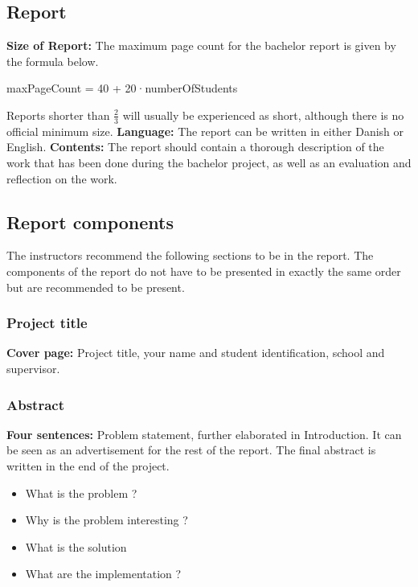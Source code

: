 \subsection{Report}
\textbf{Size of Report:} The maximum page count for the bachelor report is given by the formula below.
\begin{center}maxPageCount = 40 + 20·numberOfStudents\end{center}
Reports shorter than \(\frac{2}{3}\) will usually be experienced as short, although there is no official minimum size.
\newline
\newline
\textbf{Language:} The report can be written in either Danish or English.
\newline
\newline
\textbf{Contents:} The report should contain a thorough description of the work that has been done during the bachelor project, as well as an evaluation and reflection on the work.

\subsection{Report components}
The instructors recommend the following sections to be in the report. The components of the report do not have to be presented in exactly the same order but are recommended to be present.

\subsubsection{Project title}
\textbf{Cover page:} Project title, your name and student identification, school and supervisor.
\newline
\subsubsection{Abstract}
\textbf{Four sentences:} Problem statement, further elaborated  in  Introduction. It can be seen as an advertisement for the rest of the report. The final abstract is written in the end of the project.

\begin{itemize}
    \item What is the problem ?
    \item Why is the problem interesting ?
    \item What is the solution
    \item What are the implementation ?
\end{itemize}

